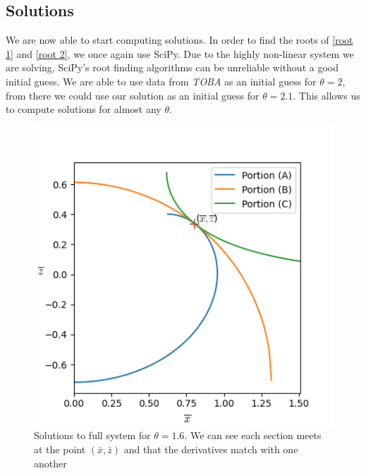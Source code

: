 \subsection{Solutions}
We are now able to start computing solutions. In order to find the roots of \ref{root 1} and \ref{root 2}, we once again use SciPy. Due to the highly non-linear system we are solving, SciPy's root finding algorithms can be unreliable without a good initial guess. We are able to use data from \textit{TOBA} \cite{toba1959drop} as an initial guess for $\theta=2$, from there we could use our solution as an initial guess for $\theta=2.1$. This allows us to compute solutions for almost any $\theta$.

\begin{figure}
    \centering
    \includegraphics[width=0.85\linewidth]{WriteUp/images/combined theta=1.6.png}
    \caption{Solutions to full system for $\theta=1.6$. We can see each section meets at the point $(\bar{x},\bar{z})$ and that the derivatives match with one another}
    \label{fig:8}
\end{figure}

